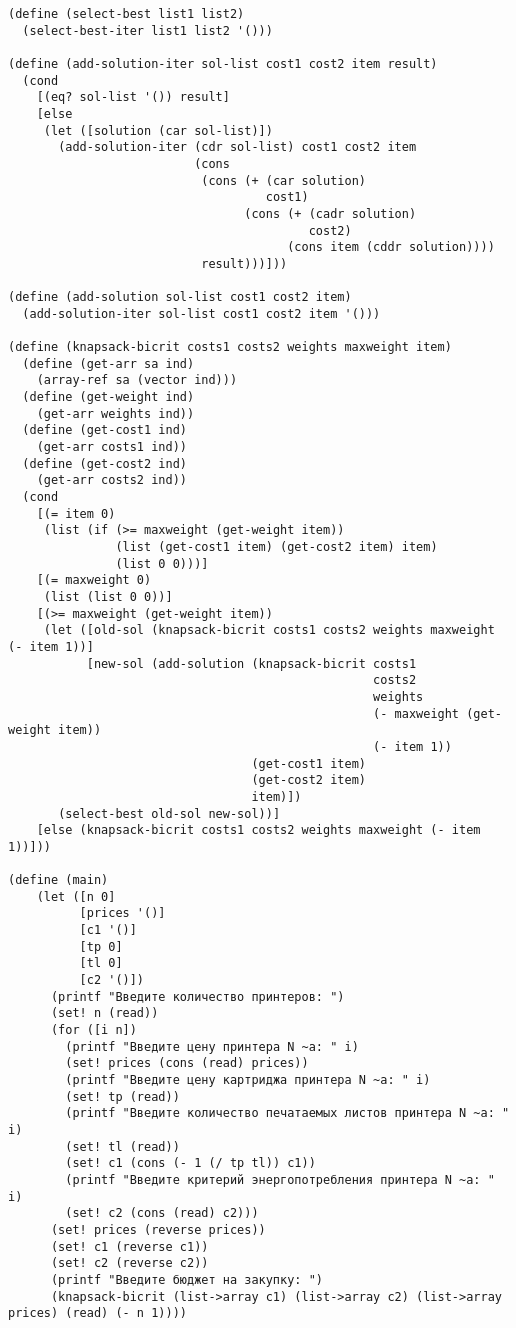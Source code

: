\begin{lstlisting}[style=customlisp, caption=cw.rkt]
(define (select-best list1 list2)
  (select-best-iter list1 list2 '()))

(define (add-solution-iter sol-list cost1 cost2 item result)
  (cond
    [(eq? sol-list '()) result]
    [else
     (let ([solution (car sol-list)]) 
       (add-solution-iter (cdr sol-list) cost1 cost2 item 
                          (cons 
                           (cons (+ (car solution) 
                                    cost1) 
                                 (cons (+ (cadr solution) 
                                          cost2) 
                                       (cons item (cddr solution)))) 
                           result)))]))

(define (add-solution sol-list cost1 cost2 item)
  (add-solution-iter sol-list cost1 cost2 item '()))

(define (knapsack-bicrit costs1 costs2 weights maxweight item)
  (define (get-arr sa ind)
    (array-ref sa (vector ind)))
  (define (get-weight ind)
    (get-arr weights ind))
  (define (get-cost1 ind)
    (get-arr costs1 ind))
  (define (get-cost2 ind)
    (get-arr costs2 ind))
  (cond
    [(= item 0)
     (list (if (>= maxweight (get-weight item))
               (list (get-cost1 item) (get-cost2 item) item)
               (list 0 0)))]
    [(= maxweight 0)
     (list (list 0 0))]
    [(>= maxweight (get-weight item))
     (let ([old-sol (knapsack-bicrit costs1 costs2 weights maxweight (- item 1))]
           [new-sol (add-solution (knapsack-bicrit costs1 
                                                   costs2 
                                                   weights 
                                                   (- maxweight (get-weight item)) 
                                                   (- item 1))
                                  (get-cost1 item)
                                  (get-cost2 item)
                                  item)])
       (select-best old-sol new-sol))]
    [else (knapsack-bicrit costs1 costs2 weights maxweight (- item 1))]))

(define (main)
    (let ([n 0]
          [prices '()]
          [c1 '()]
          [tp 0]
          [tl 0]
          [c2 '()])
      (printf "Введите количество принтеров: ")
      (set! n (read))
      (for ([i n])
        (printf "Введите цену принтера N ~a: " i)
        (set! prices (cons (read) prices))
        (printf "Введите цену картриджа принтера N ~a: " i)
        (set! tp (read))
        (printf "Введите количество печатаемых листов принтера N ~a: " i)
        (set! tl (read))
        (set! c1 (cons (- 1 (/ tp tl)) c1))
        (printf "Введите критерий энергопотребления принтера N ~a: " i)
        (set! c2 (cons (read) c2)))
      (set! prices (reverse prices))
      (set! c1 (reverse c1))
      (set! c2 (reverse c2))
      (printf "Введите бюджет на закупку: ")
      (knapsack-bicrit (list->array c1) (list->array c2) (list->array prices) (read) (- n 1))))
\end{lstlisting}
